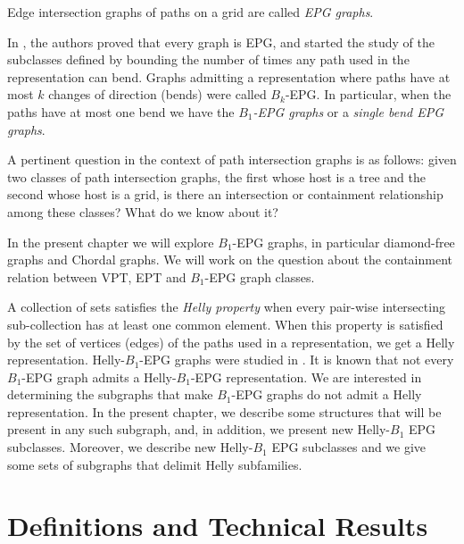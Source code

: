 Edge intersection graphs of paths on a grid are called \textit{EPG graphs}. 

In \cite{golumbic2009}, the authors proved that every graph is EPG, and started the study of the subclasses
defined by bounding the number of times any path used in the representation can bend.  Graphs admitting a representation
where  paths  have at most $k$ changes of direction  (bends) were called $B_k$-EPG. 
 In particular, when the paths have at most one bend we have the \textit{ $B_1$-EPG graphs} or a \textit{single bend EPG graphs}.

 A pertinent question in the context of path intersection graphs is as follows: given two classes of path intersection graphs,
 the first whose host is a tree and the second whose host is a grid,  is there an intersection or containment relationship among these classes? What do we know about it?

In the present chapter we will explore $B_1$-EPG graphs, in particular diamond-free graphs and Chordal graphs. We will work on the question about the containment relation between  VPT, EPT and $B_1$-EPG graph classes.


 A collection  of sets satisfies the \textit{Helly property} when every pair-wise intersecting sub-collection  has at least one common element. When this property
 is satisfied by the set of vertices (edges) of the paths used in a representation, we get a Helly representation.  Helly-$B_1$-EPG graphs were studied
 in \cite{bornstein2019, dmtcs:6506}.                                     
It is known that not every $B_1$-EPG graph admits a Helly-$B_1$-EPG representation. We are interested in determining the subgraphs that make
$B_1$-EPG graphs do not admit a Helly representation. In the present chapter, we describe some structures that will be present in any such subgraph,
and, in addition, we present new  Helly-$B_1$ EPG  subclasses.
Moreover,  we  describe new  Helly-$B_1$ EPG  subclasses %
and we give some sets of subgraphs that delimit Helly subfamilies.   
\section{Definitions and Technical Results}

